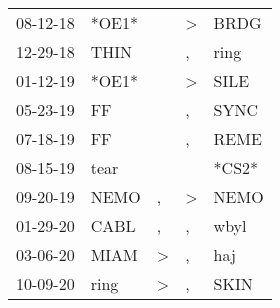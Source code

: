 \begin{supertabular}{p{0.07\textwidth}p{0.06\textwidth}p{0.02\textwidth}p{0.02\textwidth}p{0.06\textwidth}}
          08-12-18\textsuperscript{} &                            *OE1* &                  &     \textgreater &           BRDG\textsuperscript{} \\
          12-29-18\textsuperscript{} &           THIN\textsuperscript{} &                  &                , &           ring\textsuperscript{} \\
          01-12-19\textsuperscript{} &                            *OE1* &                  &     \textgreater &           SILE\textsuperscript{} \\
          05-23-19\textsuperscript{} &             FF\textsuperscript{} &                  &                , &           SYNC\textsuperscript{} \\
          07-18-19\textsuperscript{} &             FF\textsuperscript{} &                  &                , &           REME\textsuperscript{} \\
          08-15-19\textsuperscript{} &           tear\textsuperscript{} &                  &                  &                            *CS2* \\
          09-20-19\textsuperscript{} &           NEMO\textsuperscript{} &                , &     \textgreater &           NEMO\textsuperscript{} \\
          01-29-20\textsuperscript{} &           CABL\textsuperscript{} &                , &                , &           wbyl\textsuperscript{} \\
          03-06-20\textsuperscript{} &           MIAM\textsuperscript{} &     \textgreater &                , &            haj\textsuperscript{} \\
          10-09-20\textsuperscript{} &           ring\textsuperscript{} &     \textgreater &                , &           SKIN\textsuperscript{} \\
\end{supertabular}
